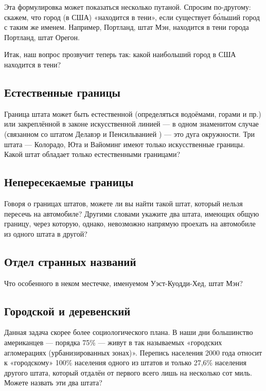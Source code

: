 \medskip

Эта формулировка может показаться несколько путаной.
Спросим по-другому: скажем, что город (в США) «находится в тени», если существует б\'{о}льший город с таким же именем.
Например, Портланд, штат Мэн, находится в тени города Портланд, штат Орегон.

Итак, наш вопрос прозвучит теперь так: какой наибольший город в США находится в тени?   

\subsection*{Естественные границы}%

Граница штата может быть естественной (определяться водоёмами, горами и пр.) или 
закреплённой в законе искусственной линией --- в одном знаменитом случае (связанном со штатом Делавэр и Пенсильванией ) --- это дуга окружности.
Три штата --- Колорадо, Юта и Вайоминг имеют только искусственные границы.
Какой штат обладает только естественными границами?   

\subsection*{Непересекаемые границы}%

Говоря о границах штатов, можете ли вы найти такой штат, который нельзя пересечь на автомобиле? Другими словами укажите два штата, имеющих общую границу, через которую, однако, невозможно напрямую проехать на автомобиле из одного штата в другой?   

\subsection*{Отдел странных названий}%

Что особенного в неком местечке, именуемом Уэст-Куодди-Хед, %
штат Мэн?   

\subsection*{Городской и деревенский}%

Данная задача скорее более социологического плана.
В наши дни большинство американцев --- порядка 75\% --- живут в так называемых «городских агломерациях (урбанизированных зонах)».
Перепись населения 2000 года относит к «городскому» 100\% населения одного из штатов и только 27,6\% населения другого штата, который отдалён от первого всего лишь на несколько сот миль.
Можете назвать эти два штата?   

